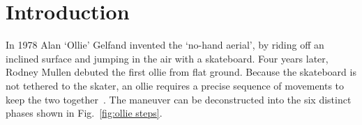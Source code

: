 \documentclass[default,iicol,pdflatex]{sn-jnl}
\begin{document}

\maketitle

\section{Introduction}\label{s_intro}

In 1978 Alan `Ollie' Gelfand invented the `no-hand aerial', by riding off an inclined surface and jumping in the air with a skateboard.
Four years later, Rodney Mullen debuted the first ollie from flat ground.
Because the skateboard is not tethered to the skater, an ollie requires a precise sequence of movements to keep the two together~\cite{frederick_biomechanics_2006}.
The maneuver can be deconstructed into the six
distinct phases shown in Fig.~\ref{fig:ollie steps}.
\end{document}
